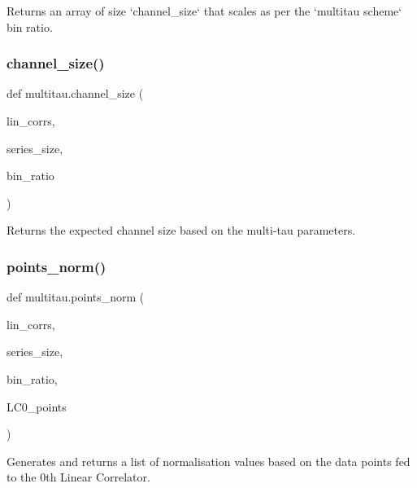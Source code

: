 \begin{DoxyVerb}Returns an array of size `channel_size` that scales as per the `multitau scheme` bin ratio.
\end{DoxyVerb}
 \mbox{\label{namespacemultitau_a1022c52950a892396ac45e7de5379e12}} 
\subsubsection{\texorpdfstring{channel\+\_\+size()}{channel\_size()}}
{\footnotesize\ttfamily def multitau.\+channel\+\_\+size (\begin{DoxyParamCaption}\item[{}]{lin\+\_\+corrs,  }\item[{}]{series\+\_\+size,  }\item[{}]{bin\+\_\+ratio }\end{DoxyParamCaption})}

\begin{DoxyVerb}Returns the expected channel size based on the multi-tau parameters.
\end{DoxyVerb}
 \mbox{\label{namespacemultitau_a89bb2627a88498b04ebd436250310d71}} 
\subsubsection{\texorpdfstring{points\+\_\+norm()}{points\_norm()}}
{\footnotesize\ttfamily def multitau.\+points\+\_\+norm (\begin{DoxyParamCaption}\item[{}]{lin\+\_\+corrs,  }\item[{}]{series\+\_\+size,  }\item[{}]{bin\+\_\+ratio,  }\item[{}]{L\+C0\+\_\+points }\end{DoxyParamCaption})}

\begin{DoxyVerb}Generates and returns a list of normalisation values based on the data points fed to 
the 0th Linear Correlator.
\end{DoxyVerb}
 \mbox{\label{namespacemultitau_a265372a8ef814094424e2d787eb6304f}} 
